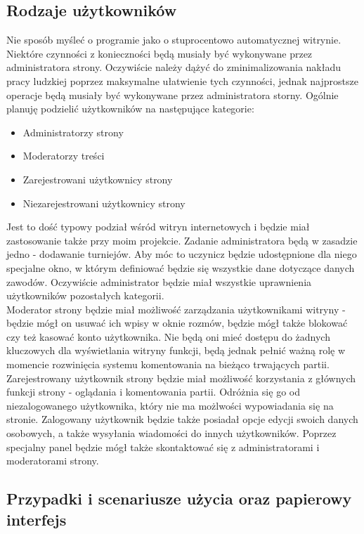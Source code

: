 \documentclass[12pt,leqno]{article}
\begin{document}
\subsection{Rodzaje użytkowników}
Nie sposób myśleć o programie jako o stuprocentowo automatycznej witrynie. Niektóre czynności z konieczności będą musiały być wykonywane przez administratora strony. Oczywiście należy dążyć do zminimalizowania nakładu pracy ludzkiej poprzez maksymalne ułatwienie tych czynności, jednak najprostsze operacje będą musiały być wykonywane przez administratora storny. Ogólnie planuję podzielić użytkowników na następujące kategorie:
\begin{itemize}
\item Administratorzy strony
\item Moderatorzy treści 
\item Zarejestrowani użytkownicy strony
\item Niezarejestrowani użytkownicy strony
\end{itemize}
Jest to dość typowy podział wśród witryn internetowych i będzie miał zastosowanie także przy moim projekcie. Zadanie administratora będą w zasadzie jedno - dodawanie turniejów. Aby móc to uczynicz będzie udostępnione dla niego specjalne okno, w którym definiować będzie się wszystkie dane dotyczące danych zawodów. Oczywiście administrator będzie miał wszystkie uprawnienia użytkowników pozostałych kategorii. \\
Moderator strony będzie miał możliwość zarządzania użytkownikami witryny - będzie mógł on usuwać ich wpisy w oknie rozmów, będzie mógł także blokować czy też kasować konto użytkownika. Nie będą oni mieć dostępu do żadnych kluczowych dla wyświetlania witryny funkcji, będą jednak pełnić ważną rolę w momencie rozwinięcia systemu komentowania na bieżąco trwających partii. \\
Zarejestrowany użytkownik strony będzie miał możliwość korzystania z głównych funkcji strony - oglądania i komentowania partii. Odróżnia się go od niezalogowanego użytkownika, który nie ma możlwości wypowiadania się na stronie. Zalogowany użytkownik będzie także posiadał opcje edycji swoich danych osobowych, a także wysyłania wiadomości do innych użytkowników. Poprzez specjalny panel będzie mógł także skontaktować się z administratorami i moderatorami strony.




\subsection{Przypadki i scenariusze użycia oraz papierowy interfejs}
\end{document}
